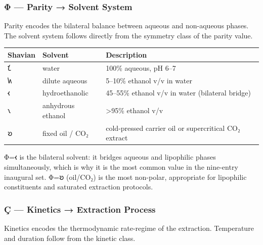 \documentclass[12pt,a4paper]{article}
\begin{document}
\hypertarget{ux3c6-parity-solvent-system}{%
\subsubsection{Φ --- Parity → Solvent
System}\label{ux3c6-parity-solvent-system}}

Parity encodes the bilateral balance between aqueous and non-aqueous
phases. The solvent system follows directly from the symmetry class of
the parity value.

\begin{longtable}[]{@{}lll@{}}
\toprule
Shavian & Solvent & Description\tabularnewline
\midrule
\endhead
𐑗 & water & 100\% aqueous, pH 6--7\tabularnewline
𐑿 & dilute aqueous & 5--10\% ethanol v/v in water\tabularnewline
𐑬 & hydroethanolic & 45--55\% ethanol v/v in water (bilateral
bridge)\tabularnewline
𐑯 & anhydrous ethanol & \textgreater95\% ethanol v/v\tabularnewline
𐑹 & fixed oil / CO₂ & cold-pressed carrier oil or supercritical CO₂
extract\tabularnewline
\bottomrule
\end{longtable}

Φ=𐑬 is the bilateral solvent: it bridges aqueous and lipophilic phases
simultaneously, which is why it is the most common value in the
nine-entry inaugural set. Φ=𐑹 (oil/CO₂) is the most non-polar,
appropriate for lipophilic constituents and saturated extraction
protocols.

\hypertarget{uxe7-kinetics-extraction-process}{%
\subsubsection{Ç --- Kinetics → Extraction
Process}\label{uxe7-kinetics-extraction-process}}

Kinetics encodes the thermodynamic rate-regime of the extraction.
Temperature and duration follow from the kinetic class.
\end{document}
